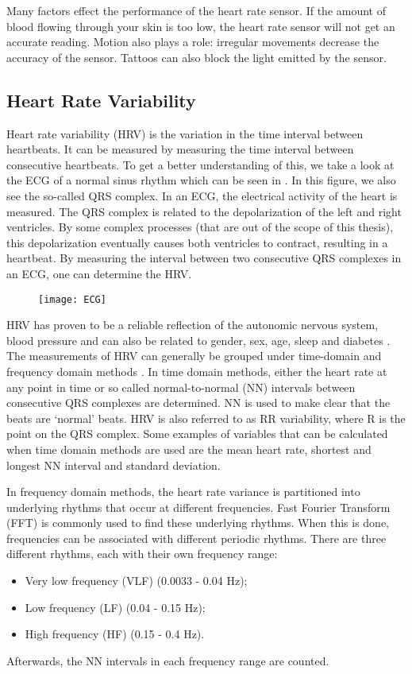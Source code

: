 Many factors effect the performance of the heart rate sensor. 
If the amount of blood flowing through your skin is too low, the heart rate sensor will not get an accurate reading. 
Motion also plays a role: irregular movements decrease the accuracy of the sensor. 
Tattoos can also block the light emitted by the sensor.


\subsection{Heart Rate Variability} \label{section:HRV}
Heart rate variability (HRV) is the variation in the time interval between heartbeats.
It can be measured by measuring the time interval between consecutive heartbeats.
To get a better understanding of this, we take a look at the ECG of a normal sinus rhythm which can be seen in . In this figure, we also see the so-called QRS complex.
In an ECG, the electrical activity of the heart is measured.
The QRS complex is related to the depolarization of the left and right ventricles. 
By some complex processes (that are out of the scope of this thesis), this depolarization eventually causes both ventricles to contract, resulting in a heartbeat. 
By measuring the interval between two consecutive QRS complexes in an ECG, one can determine the HRV.
%
\begin{figure}
	\centering
	\texttt{[image: ECG]}
	\label{fig:ECG}
\end{figure}
%
HRV has proven to be a reliable reflection of the autonomic nervous system, blood pressure and can also be related to gender, sex, age, sleep and diabetes \cite{acharya2006heart}.
The measurements of HRV can generally be grouped under time-domain and frequency domain methods \cite{task1996heart}.
In time domain methods, either the heart rate at any point in time or so called normal-to-normal (NN) intervals between consecutive QRS complexes are determined.
NN is used to make clear that the beats are `normal' beats.
HRV is also referred to as RR variability, where R is the point on the QRS complex.
Some examples of variables that can be calculated when time domain methods are used are the mean heart rate, shortest and longest NN interval and standard deviation.

In frequency domain methods, the heart rate variance is partitioned into underlying rhythms that occur at different frequencies.
Fast Fourier Transform (FFT) is commonly used to find these underlying rhythms.
When this is done, frequencies can be associated with different periodic rhythms.
There are three different rhythms, each with their own frequency range:
%
\begin{itemize}
	\item Very low frequency (VLF) (0.0033 - 0.04 Hz);
	\item Low frequency (LF) (0.04 - 0.15 Hz);
	\item High frequency (HF) (0.15 - 0.4 Hz).
\end{itemize}
%
Afterwards, the NN intervals in each frequency range are counted.

